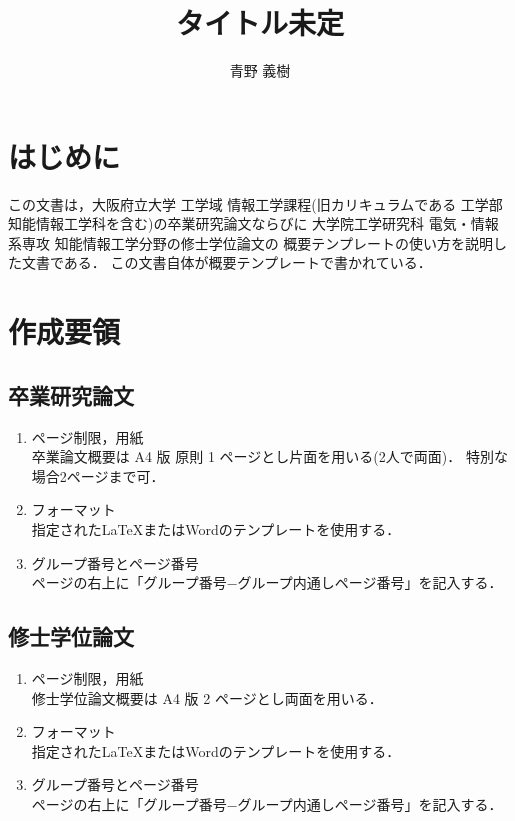 \documentclass[a4paper,twoside,twocolumn,10pt]{article}
\title{タイトル未定}
\author{青野 義樹}
\begin{document}
\maketitle %
\small

\section{はじめに}
この文書は，大阪府立大学 工学域 情報工学課程(旧カリキュラムである
工学部 知能情報工学科を含む)の卒業研究論文ならびに
大学院工学研究科 電気・情報系専攻 知能情報工学分野の修士学位論文の
概要テンプレートの使い方を説明した文書である．
この文書自体が概要テンプレートで書かれている．



\section{作成要領}

\subsection{卒業研究論文}
\begin{enumerate}
\item ページ制限，用紙\\
  卒業論文概要は A4 版 原則 1 ページとし片面を用いる(2人で両面)．
  特別な場合2ページまで可．
\item フォーマット\\
  指定されたLaTeXまたはWordのテンプレートを使用する．
\item グループ番号とページ番号\\
  ページの右上に「グループ番号−グループ内通しページ番号」を記入する．
\end{enumerate}

\subsection{修士学位論文}
\begin{enumerate}
\item ページ制限，用紙\\
  修士学位論文概要は A4 版 2 ページとし両面を用いる．
\item フォーマット\\
  指定されたLaTeXまたはWordのテンプレートを使用する．
\item グループ番号とページ番号\\
  ページの右上に「グループ番号−グループ内通しページ番号」を記入する．
\end{enumerate}
\end{document}
